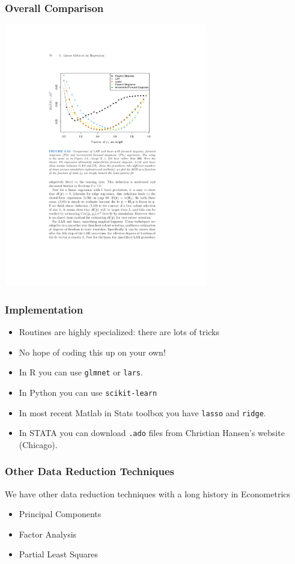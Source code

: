 \documentclass[xcolor=pdftex,dvipsnames,table,mathserif]{beamer}
\begin{document}
\begin{frame}
\frametitle{Overall Comparison}
\begin{center}
\includegraphics[width=3.5in]{./resources/compareall}
\end{center}
\end{frame}

\begin{frame}
\frametitle{Implementation}
\begin{itemize}
\item Routines are highly specialized: there are lots of tricks
\item No hope of coding this up on your own!
\item In R you can use \texttt{glmnet} or \texttt{lars}.
\item In Python you can use \texttt{scikit-learn}
\item In most recent Matlab in Stats toolbox you have \texttt{lasso} and \texttt{ridge}.
\item In STATA you can download \texttt{.ado} files from Christian Hansen's website (Chicago).
\end{itemize}
\end{frame}

\begin{frame}
\frametitle{Other Data Reduction Techniques}
We have other data reduction techniques with a long history in Econometrics
\begin{itemize}
\item Principal Components
\item Factor Analysis
\item Partial Least Squares
\end{itemize}
\end{frame}
\end{document}
